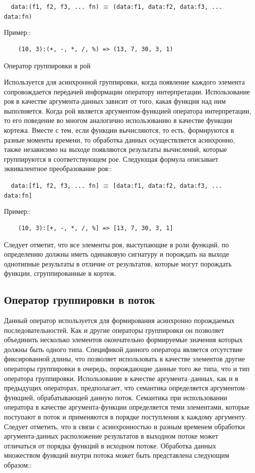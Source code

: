 \verb|  data:(f1, f2, f3, ... fn)| $\equiv$ \verb|(data:f1, data:f2, data:f3, ... data:fn)|

Пример::
\begin{verbatim}
    (10, 3):(+, -, *, /, %) => (13, 7, 30, 3, 1)
\end{verbatim}


Оператор группировки в рой
~~~~~~~~~~~~~~~~~~~~~~~~~~~~~~~~~~~~~~~

Используется для асинхронной группировки, когда появление каждого элемента сопровождается передачей информации оператору интерпретации. Использование роя в качестве аргумента-данных зависит от того, какая функция над ним выполняется. Когда рой является аргументом-функцией оператора интерпретации, то его поведение во многом аналогично использованию в качестве функции кортежа. Вместе с тем, если функции вычисляются, то есть, формируются в разные моменты времени, то обработка данных осуществляется асинхронно, также независимо на выходе появляются результаты вычислений, которые группируются в соответствующем рое. Следующая формула описывает эквивалентное преобразование роя::

\verb|  data:[f1, f2, f3, ... fn]| $\equiv$ \verb|[data:f1, data:f2, data:f3, ... data:fn]|

Пример::
\begin{verbatim}
    (10, 3):[+, -, *, /, %] => [13, 7, 30, 3, 1]
\end{verbatim}


Следует отметит, что все элементы роя, выступающие в роли функций, по определению должны иметь одинаковую сигнатуру и порождать на выходе однотипные результаты в отличие от результатов, которые могут порождать функции, сгруппированные в кортеж.

\subsection{Оператор группировки в поток}

Данный оператор используется для формирования асинхронно порождаемых последовательностей. Как и другие операторы группировки он позволяет объединить несколько элементов окончательно формируемые значения которых должны быть одного типа. Спецификой данного оператора является отсутствие фиксированной длины, что позволяет использовать в качестве элементов другие операторы группировки в очередь, порождающие данные того же типа, что и тип оператора группировки. Использование в качестве аргумента--данных, как и в предыдущих операторах, предполагает, что семантика определяется аргументом--функцией, обрабатывающей данную поток. Семантика при использовании оператора в качестве аргумента-функции определяется теми элементами, которые поступают в поток и применяются в порядке поступления к каждому аргументу. Следует отметить, что в связи с асинхронностью и разным временем обработки аргумента-данных расположение результатов в выходном потоке может отличаться от порядка функций в исходном потоке. Обработка данных множеством функций внутри потока может быть представлена следующим образом::

